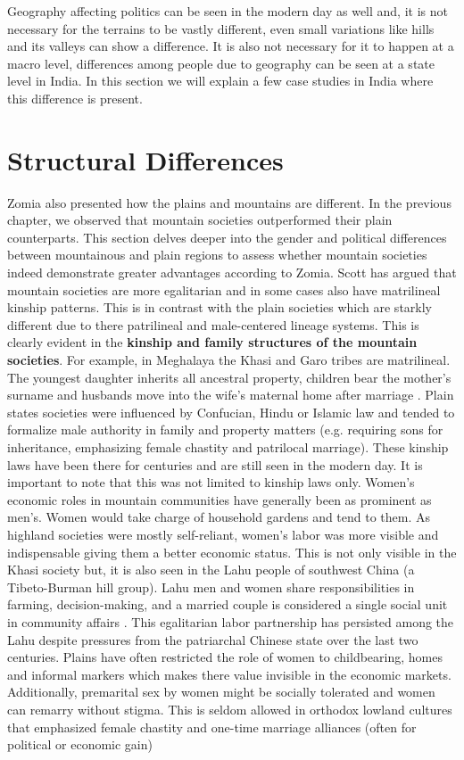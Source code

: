\vspace{0.3cm}

Geography affecting politics can be seen in the modern day as well and, it is not necessary for the terrains to be vastly different, even small variations like hills and its valleys can show a difference. It is also not necessary for it to happen at a macro level, differences among people due to geography can be seen at a state level in India. In this section we will explain a few case studies in India where this difference is present. 

\section{Structural Differences}

Zomia  also presented  how the plains and mountains are different. In the previous chapter, we observed that mountain societies outperformed their plain counterparts. This section delves deeper into the gender and political differences between mountainous and plain regions to assess whether mountain societies indeed demonstrate greater advantages according to Zomia. Scott has argued that mountain societies are more egalitarian and in some cases also have matrilineal kinship patterns. This is in contrast with the plain societies which are starkly different due to there patrilineal and male\hyp{}centered lineage systems. This is clearly evident in the \textbf{kinship and family structures of the mountain societies}. For example, in Meghalaya the Khasi and Garo tribes are matrilineal. The youngest daughter inherits all ancestral property, children bear the mother's surname and husbands move into the wife’s maternal home after marriage \citep{Allen_2012}. Plain states societies were influenced by Confucian, Hindu or Islamic law and tended to formalize male authority in family and property matters (e.g. requiring sons for inheritance, emphasizing female chastity and patrilocal marriage). These kinship laws have been there for centuries and are still seen in the modern day. It is important to note that this was not limited to kinship laws only. Women’s economic roles in mountain communities have generally been as prominent as men’s. Women would take charge of household gardens and tend to them. As highland societies were mostly self\hyp{}reliant, women's labor was more visible and indispensable giving them a better economic status. This is not only visible in the Khasi society but, it is also seen in the Lahu people of southwest China (a Tibeto\hyp{}Burman hill group). Lahu men and women share responsibilities in farming, decision\hyp{}making,  and a married couple is considered a single social unit in community affairs \citep{Du_2015}. This egalitarian labor partnership has persisted among the Lahu despite pressures from the patriarchal Chinese state over the last two centuries. Plains have often restricted the role of women to childbearing, homes and informal markers which makes there value invisible in the economic markets. Additionally, premarital sex by women might be socially tolerated and women can remarry without stigma. This is seldom allowed in orthodox lowland cultures that emphasized female chastity and one\hyp{}time marriage alliances (often for political or economic gain)
